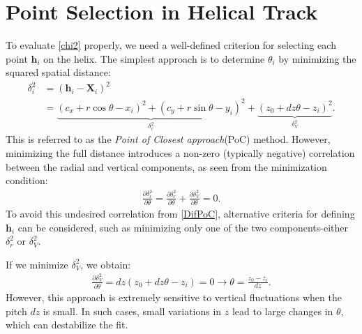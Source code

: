 \documentclass{article}
\begin{document}
	\section{Point Selection in Helical Track}
	To evaluate \eqref{chi2} properly, we need a well-defined criterion for selecting each point $\mathbf{h}_i$ on the helix. The simplest approach is to determine $\theta_i$ by minimizing the squared spatial distance:
	\begin{align}
		\delta_i^2 &= (\mathbf h_i - \mathbf X_i)^2 \nonumber \\
		&=\underbrace{(c_x+r \cos\theta - x_i)^2+(c_y+r \sin\theta - y_i)^2}_{\delta_r^2} + \underbrace{(z_0 + dz\theta -z_i)^2}_{\delta_V^2}.\label{PoC}
	\end{align}
	This is referred to as the \textit{Point of Closest approach}(PoC) method. However, minimizing the full distance introduces a non-zero (typically negative) correlation between the radial and vertical components, as seen from the minimization condition:
	\begin{align}
		\frac{\partial \delta_i^2}{\partial \theta} = \frac{\partial \delta_r^2}{\partial \theta}+\frac{\partial \delta_V^2}{\partial \theta} = 0.\label{DifPoC}
	\end{align}
	To avoid this undesired correlation from \eqref{DifPoC}, alternative criteria for defining $\mathbf h_i$ can be considered, such as minimizing only one of the two components-either $\delta_r^2$ or $\delta_V^2$.
	
	If we minimize $\delta_V^2$, we obtain:
	\begin{align}
		\frac{\partial \delta_V^2}{\partial \theta} = dz (z_0+dz\theta-z_i)=0\to \theta = \frac{z_0-z_i}{dz}\label{dV}.
	\end{align}
	However, this approach is extremely sensitive to vertical fluctuations when the pitch $dz$ is small. In such cases, small variations in $z$ lead to large changes in $\theta$, which can destabilize the fit.
\end{document}

